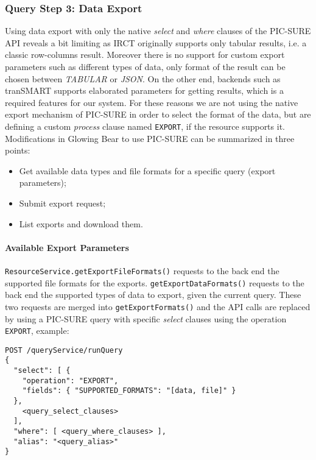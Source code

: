 \subsubsection{Query Step 3:  Data Export}

Using data export with only the native \emph{select} and \emph{where} clauses of the PIC-SURE API reveals a bit limiting as IRCT originally supports only tabular results, i.e. a classic row-columns result.
Moreover there is no support for custom export parameters such as different types of data, only format of the result can be chosen between \emph{TABULAR} or \emph{JSON}.
On the other end, backends such as tranSMART supports elaborated parameters for getting results, which is a required features for our system.
For these reasons we are not using the native export mechanism of PIC-SURE in order to select the format of the data, but are defining a custom \emph{process} clause named \verb|EXPORT|, if the resource supports it.
Modifications in Glowing Bear to use PIC-SURE can be summarized in three points:
\begin{itemize}
    \item Get available data types and file formats for a specific query (export parameters);
    \item Submit export request;
    \item List exports and download them.
\end{itemize}

\paragraph{Available Export Parameters}

\verb|ResourceService.getExportFileFormats()| requests to the back end the supported file formats for the exports.
\verb|getExportDataFormats()| requests to the back end the supported types of data to export, given the current query.
These two requests are merged into \verb|getExportFormats()| and the API calls are replaced by using a PIC-SURE query with specific \emph{select} clauses using the operation \verb|EXPORT|, example:
\begin{verbatim}
POST /queryService/runQuery
{
  "select": [ {
    "operation": "EXPORT",
    "fields": { "SUPPORTED_FORMATS": "[data, file]" }
  }, 
    <query_select_clauses>
  ],
  "where": [ <query_where_clauses> ],
  "alias": "<query_alias>"
} 
\end{verbatim}


